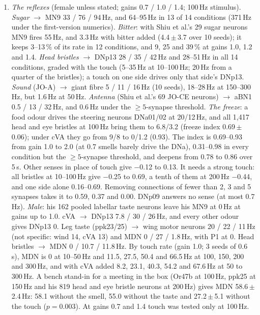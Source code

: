 \begin{enumerate}[leftmargin=*, label=\arabic*., itemsep=4pt]
\item \emph{The reflexes} (female unless stated; gains 0.7 / 1.0 / 1.4; 100\,Hz stimulus). \emph{Sugar} $\rightarrow$ MN9 33 / 76 / 94\,Hz, and 64--95\,Hz in 13 of 14 conditions (371\,Hz under the first-version numerics). \emph{Bitter}: with Shiu et al.'s 29 sugar neurons MN9 fires 55\,Hz, and 3.3\,Hz with bitter added (4.4\,$\pm$\,3.7 over 10 seeds); it keeps 3--13\,\% of its rate in 12 conditions, and 9, 25 and 39\,\% at gains 1.0, 1.2 and 1.4. \emph{Head bristles} $\rightarrow$ DNp13 28 / 35 / 42\,Hz and 28--51\,Hz in all 14 conditions, graded with the touch (5--35\,Hz at 10--100\,Hz; 20\,Hz from a quarter of the bristles); a touch on one side drives only that side's DNp13. \emph{Sound} (JO-A) $\rightarrow$ giant fibre 5 / 11 / 16\,Hz (10 seeds), 18--28\,Hz at 150--300\,Hz, but 1.6\,Hz at 50\,Hz. \emph{Antenna} (Shiu et al.'s 69 JO-CE neurons) $\rightarrow$ aBN1 0.5 / 13 / 32\,Hz, and 0.6\,Hz under the $\geq5$-synapse threshold. \emph{The freeze}: a food odour drives the steering neurons DNa01/02 at 20/12\,Hz, and all 1{,}417 head and eye bristles at 100\,Hz bring them to 6.8/3.2 (freeze index 0.69\,$\pm$\,0.06); under cVA they go from 9/8 to 0/1.2 (0.93). The index is 0.69--0.93 from gain 1.0 to 2.0 (at 0.7 smells barely drive the DNa), 0.31--0.98 in every condition but the $\geq5$-synapse threshold, and deepens from 0.78 to 0.86 over 5\,s. Other senses in place of touch give $-$0.12 to 0.13. It needs a strong touch: all bristles at 10--100\,Hz give $-$0.25 to 0.69, a tenth of them at 200\,Hz $-$0.44, and one side alone 0.16--0.69. Removing connections of fewer than 2, 3 and 5 synapses takes it to 0.59, 0.37 and 0.00. DNp09 answers no sense (at most 0.7\,Hz). \emph{Male}: his 162 pooled labellar taste neurons leave his MN9 at 0\,Hz at gains up to 1.0. cVA $\rightarrow$ DNp13 7.8 / 30 / 26\,Hz, and every other odour gives DNp13 0. Leg taste (ppk23/25) $\rightarrow$ wing motor neurons 20 / 22 / 11\,Hz (not specific: wind 14, cVA 13) and MDN 0 / 27 / 1.8\,Hz, with P1 at 0. Head bristles $\rightarrow$ MDN 0 / 10.7 / 11.8\,Hz. By touch rate (gain 1.0; 3 seeds of 0.6\,s), MDN is 0 at 10--50\,Hz and 11.5, 27.5, 50.4 and 66.5\,Hz at 100, 150, 200 and 300\,Hz, and with cVA added 8.2, 23.1, 40.3, 54.2 and 67.6\,Hz at 50 to 300\,Hz. A bench stand-in for a meeting in the box (Or47b at 100\,Hz, ppk25 at 150\,Hz and his 819 head and eye bristle neurons at 200\,Hz) gives MDN 58.6\,$\pm$\,2.4\,Hz: 58.1 without the smell, 55.0 without the taste and 27.2\,$\pm$\,5.1 without the touch ($p=0.003$). At gains 0.7 and 1.4 touch was tested only at 100\,Hz.


\end{enumerate}
